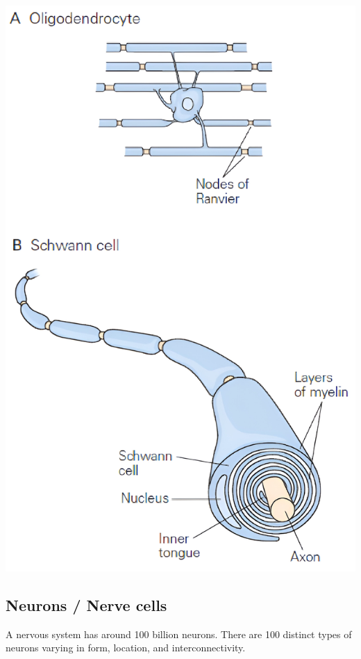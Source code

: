 \begin{minipage}{0.17\textwidth}
    \centering
    \includegraphics[width=\textwidth]{./img/insulation.png}
\end{minipage}



\subsection{Neurons / Nerve cells}

A nervous system has around 100 billion neurons.
There are 100 distinct types of neurons varying in form, location, and interconnectivity.

